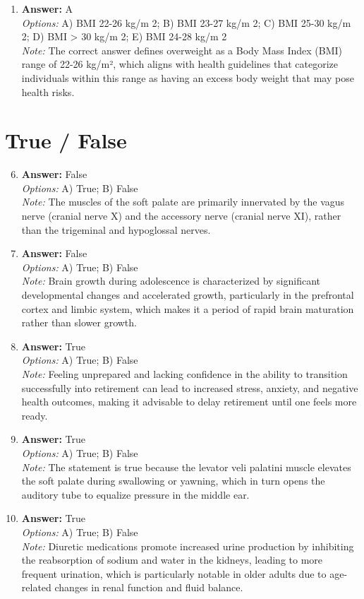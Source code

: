 \documentclass[12pt]{article}
\begin{document}
\begin{enumerate}[label=\arabic*.]
\item \textbf{Answer:} A
\\ \textit{Options:} A) BMI 22-26 kg/m 2; B) BMI 23-27 kg/m 2; C) BMI 25-30 kg/m 2; D) BMI \textgreater{} 30 kg/m 2; E) BMI 24-28 kg/m 2
\\ \textit{Note:} The correct answer defines overweight as a Body Mass Index (BMI) range of 22-26 kg/m², which aligns with health guidelines that categorize individuals within this range as having an excess body weight that may pose health risks.
\end{enumerate}

\section*{True / False}
\begin{enumerate}[label=\arabic*.]
\setcounter{enumi}{5}
\item \textbf{Answer:} False
\\ \textit{Options:} A) True; B) False
\\ \textit{Note:} The muscles of the soft palate are primarily innervated by the vagus nerve (cranial nerve X) and the accessory nerve (cranial nerve XI), rather than the trigeminal and hypoglossal nerves.
\item \textbf{Answer:} False
\\ \textit{Options:} A) True; B) False
\\ \textit{Note:} Brain growth during adolescence is characterized by significant developmental changes and accelerated growth, particularly in the prefrontal cortex and limbic system, which makes it a period of rapid brain maturation rather than slower growth.
\item \textbf{Answer:} True
\\ \textit{Options:} A) True; B) False
\\ \textit{Note:} Feeling unprepared and lacking confidence in the ability to transition successfully into retirement can lead to increased stress, anxiety, and negative health outcomes, making it advisable to delay retirement until one feels more ready.
\item \textbf{Answer:} True
\\ \textit{Options:} A) True; B) False
\\ \textit{Note:} The statement is true because the levator veli palatini muscle elevates the soft palate during swallowing or yawning, which in turn opens the auditory tube to equalize pressure in the middle ear.
\item \textbf{Answer:} True
\\ \textit{Options:} A) True; B) False
\\ \textit{Note:} Diuretic medications promote increased urine production by inhibiting the reabsorption of sodium and water in the kidneys, leading to more frequent urination, which is particularly notable in older adults due to age-related changes in renal function and fluid balance.
\end{enumerate}
\end{document}
